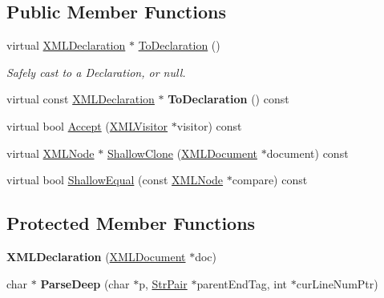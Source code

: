 \subsection*{Public Member Functions}
\begin{DoxyCompactItemize}
\item 
virtual \hyperlink{classtinyxml2_1_1XMLDeclaration}{X\+M\+L\+Declaration} $\ast$ \hyperlink{classtinyxml2_1_1XMLDeclaration_a159d8ac45865215e88059ea1e5b52fc5}{To\+Declaration} ()\hypertarget{classtinyxml2_1_1XMLDeclaration_a159d8ac45865215e88059ea1e5b52fc5}{}\label{classtinyxml2_1_1XMLDeclaration_a159d8ac45865215e88059ea1e5b52fc5}

\begin{DoxyCompactList}\small\item\em Safely cast to a Declaration, or null. \end{DoxyCompactList}\item 
virtual const \hyperlink{classtinyxml2_1_1XMLDeclaration}{X\+M\+L\+Declaration} $\ast$ {\bfseries To\+Declaration} () const \hypertarget{classtinyxml2_1_1XMLDeclaration_af724607a5fa810496fd6a21f5975a643}{}\label{classtinyxml2_1_1XMLDeclaration_af724607a5fa810496fd6a21f5975a643}

\item 
virtual bool \hyperlink{classtinyxml2_1_1XMLDeclaration_a953a7359cc312d15218eb5843a4ca108}{Accept} (\hyperlink{classtinyxml2_1_1XMLVisitor}{X\+M\+L\+Visitor} $\ast$visitor) const 
\item 
virtual \hyperlink{classtinyxml2_1_1XMLNode}{X\+M\+L\+Node} $\ast$ \hyperlink{classtinyxml2_1_1XMLDeclaration_a39458732ee6796cfc85dd35d3c488e0b}{Shallow\+Clone} (\hyperlink{classtinyxml2_1_1XMLDocument}{X\+M\+L\+Document} $\ast$document) const 
\item 
virtual bool \hyperlink{classtinyxml2_1_1XMLDeclaration_ace0d2d9bc1b63278bd5e984ebe0c7bd0}{Shallow\+Equal} (const \hyperlink{classtinyxml2_1_1XMLNode}{X\+M\+L\+Node} $\ast$compare) const 
\end{DoxyCompactItemize}
\subsection*{Protected Member Functions}
\begin{DoxyCompactItemize}
\item 
{\bfseries X\+M\+L\+Declaration} (\hyperlink{classtinyxml2_1_1XMLDocument}{X\+M\+L\+Document} $\ast$doc)\hypertarget{classtinyxml2_1_1XMLDeclaration_aef9586f2ce5df5feba74dde49a242b06}{}\label{classtinyxml2_1_1XMLDeclaration_aef9586f2ce5df5feba74dde49a242b06}

\item 
char $\ast$ {\bfseries Parse\+Deep} (char $\ast$p, \hyperlink{classtinyxml2_1_1StrPair}{Str\+Pair} $\ast$parent\+End\+Tag, int $\ast$cur\+Line\+Num\+Ptr)\hypertarget{classtinyxml2_1_1XMLDeclaration_a42a2a36f4d78dc745063b79c16538b9b}{}\label{classtinyxml2_1_1XMLDeclaration_a42a2a36f4d78dc745063b79c16538b9b}

\end{DoxyCompactItemize}
